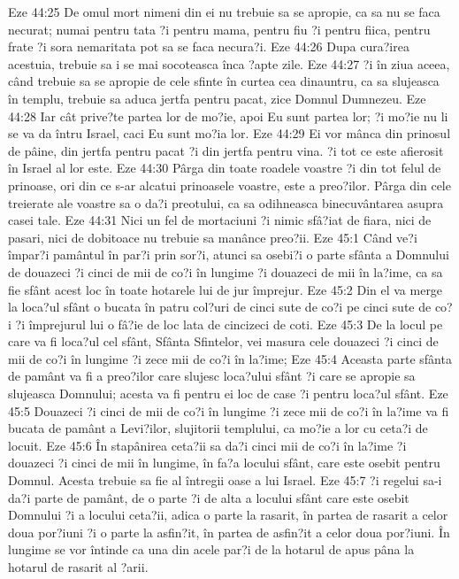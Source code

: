 Eze 44:25  De omul mort nimeni din ei nu trebuie sa se apropie, ca sa nu se faca necurat; numai pentru tata ?i pentru mama, pentru fiu ?i pentru fiica, pentru frate ?i sora nemaritata pot sa se faca necura?i.
Eze 44:26  Dupa cura?irea acestuia, trebuie sa i se mai socoteasca înca ?apte zile.
Eze 44:27  ?i în ziua aceea, când trebuie sa se apropie de cele sfinte în curtea cea dinauntru, ca sa slujeasca în templu, trebuie sa aduca jertfa pentru pacat, zice Domnul Dumnezeu.
Eze 44:28  Iar cât prive?te partea lor de mo?ie, apoi Eu sunt partea lor; ?i mo?ie nu li se va da întru Israel, caci Eu sunt mo?ia lor.
Eze 44:29  Ei vor mânca din prinosul de pâine, din jertfa pentru pacat ?i din jertfa pentru vina. ?i tot ce este afierosit în Israel al lor este.
Eze 44:30  Pârga din toate roadele voastre ?i din tot felul de prinoase, ori din ce s-ar alcatui prinoasele voastre, este a preo?ilor. Pârga din cele treierate ale voastre sa o da?i preotului, ca sa odihneasca binecuvântarea asupra casei tale.
Eze 44:31  Nici un fel de mortaciuni ?i nimic sfâ?iat de fiara, nici de pasari, nici de dobitoace nu trebuie sa manânce preo?ii.
Eze 45:1  Când ve?i împar?i pamântul în par?i prin sor?i, atunci sa osebi?i o parte sfânta a Domnului de douazeci ?i cinci de mii de co?i în lungime ?i douazeci de mii în la?ime, ca sa fie sfânt acest loc în toate hotarele lui de jur împrejur.
Eze 45:2  Din el va merge la loca?ul sfânt o bucata în patru col?uri de cinci sute de co?i pe cinci sute de co?i ?i împrejurul lui o fâ?ie de loc lata de cincizeci de coti.
Eze 45:3  De la locul pe care va fi loca?ul cel sfânt, Sfânta Sfintelor, vei masura cele douazeci ?i cinci de mii de co?i în lungime ?i zece mii de co?i în la?ime;
Eze 45:4  Aceasta parte sfânta de pamânt va fi a preo?ilor care slujesc loca?ului sfânt ?i care se apropie sa slujeasca Domnului; acesta va fi pentru ei loc de case ?i pentru loca?ul sfânt.
Eze 45:5  Douazeci ?i cinci de mii de co?i în lungime ?i zece mii de co?i în la?ime va fi bucata de pamânt a Levi?ilor, slujitorii templului, ca mo?ie a lor cu ceta?i de locuit.
Eze 45:6  În stapânirea ceta?ii sa da?i cinci mii de co?i în la?ime ?i douazeci ?i cinci de mii în lungime, în fa?a locului sfânt, care este osebit pentru Domnul. Acesta trebuie sa fie al întregii oase a lui Israel.
Eze 45:7  ?i regelui sa-i da?i parte de pamânt, de o parte ?i de alta a locului sfânt care este osebit Domnului ?i a locului ceta?ii, adica o parte la rasarit, în partea de rasarit a celor doua por?iuni ?i o parte la asfin?it, în partea de asfin?it a celor doua por?iuni. În lungime se vor întinde ca una din acele par?i de la hotarul de apus pâna la hotarul de rasarit al ?arii.
